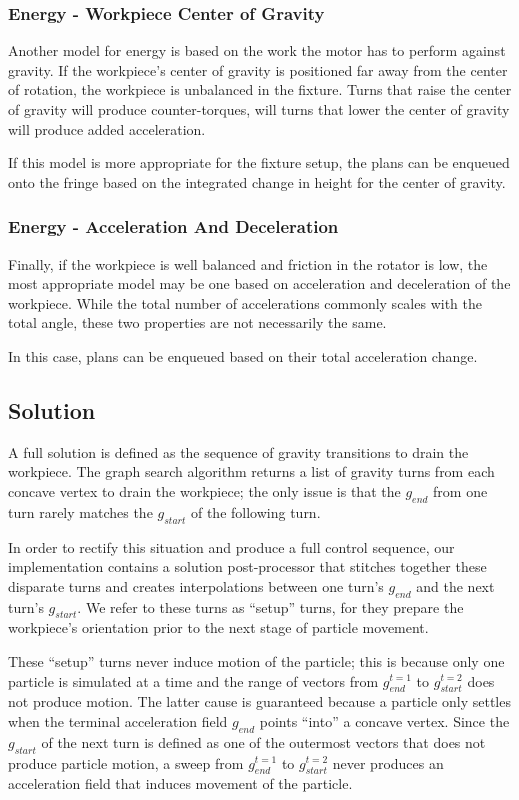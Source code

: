 		\subsubsection{Energy - Workpiece Center of Gravity}

Another model for energy is based on the work the motor has to perform against gravity. If the workpiece's center of gravity is positioned far away from the center of rotation, the workpiece is unbalanced in the fixture. Turns that raise the center of gravity will produce counter-torques, will turns that lower the center of gravity will produce added acceleration.

If this model is more appropriate for the fixture setup, the plans can be enqueued onto the fringe based on the integrated change in height for the center of gravity.

		\subsubsection{Energy - Acceleration And Deceleration}

Finally, if the workpiece is well balanced and friction in the rotator is low, the most appropriate model may be one based on acceleration and deceleration of the workpiece. While the total number of accelerations commonly scales with the total angle, these two properties are not necessarily the same.

In this case, plans can be enqueued based on their total acceleration change.

	\subsection{Solution}

A full solution is defined as the sequence of gravity transitions to drain the workpiece. The graph search algorithm returns a list of gravity turns from each concave vertex to drain the workpiece; the only issue is that the $g_{end}$ from one turn rarely matches the $g_{start}$ of the following turn.

In order to rectify this situation and produce a full control sequence, our implementation contains a solution post-processor that stitches together these disparate turns and creates interpolations between one turn's $g_{end}$ and the next turn's $g_{start}$. We refer to these turns as ``setup'' turns, for they prepare the workpiece's orientation prior to the next stage of particle movement.

These ``setup'' turns never induce motion of the particle; this is because only one particle is simulated at a time and the range of vectors from $g_{end}^{t=1}$ to $g_{start}^{t=2}$ does not produce motion. The latter cause is guaranteed because a particle only settles when the terminal acceleration field $g_{end}$ points ``into'' a concave vertex. Since the $g_{start}$ of the next turn is defined as one of the outermost vectors that does not produce particle motion, a sweep from $g_{end}^{t=1}$ to $g_{start}^{t=2}$ never produces an acceleration field that induces movement of the particle.

